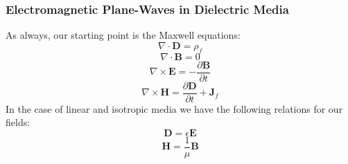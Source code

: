 \documentclass{beamer}
\begin{document}
\begin{frame}

	
	
\frametitle{Electromagnetic Plane-Waves in Dielectric Media}



As always, our starting point is the Maxwell equations: 
\begin{equation}
	\nabla \cdot \mathbf{D} = \rho_{f}
\end{equation}
\begin{equation}
	\nabla \cdot \mathbf{B} = 0
\end{equation}
\begin{equation}\label{faraday}
	\nabla \times \mathbf{E} = - \frac{\partial \mathbf{B}}{\partial t}
\end{equation}
\begin{equation}\label{ampere}
	\nabla \times \mathbf{H} =  \frac{\partial \mathbf{D}}{\partial t} + \mathbf{J}_{f}
\end{equation}
In the case of linear and isotropic media we have the following relations for our fields:
\begin{equation}
	\mathbf{D} = \epsilon \mathbf{E}
\end{equation}
\begin{equation}
	\mathbf{H} = \frac{1}{\mu} \mathbf{B}
\end{equation}



\end{frame}
\end{document}
